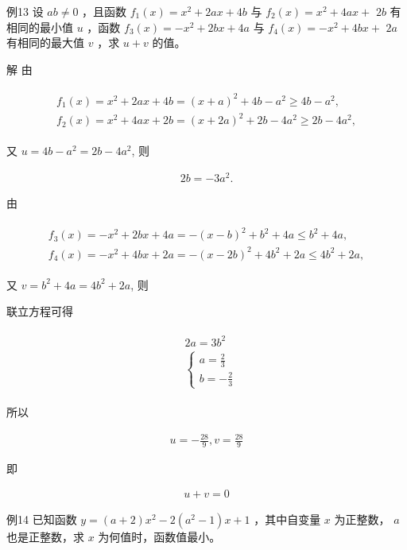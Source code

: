 \documentclass[10pt]{article}
\begin{document}
例13 设 $a b \neq 0$ ，且函数 $f_{1}(x)=x^{2}+2 a x+4 b$ 与 $f_{2}(x)=x^{2}+4 a x+$ $2 b$ 有相同的最小值 $u$ ，函数 $f_{3}(x)=-x^{2}+2 b x+4 a$ 与 $f_{4}(x)=-x^{2}+4 b x+$ $2 a$ 有相同的最大值 $v$ ，求 $u+v$ 的值。

解 由

\begin{align*}
\begin{gathered}
f_{1}(x)=x^{2}+2 a x+4 b=(x+a)^{2}+4 b-a^{2} \geqslant 4 b-a^{2}, \\
f_{2}(x)=x^{2}+4 a x+2 b=(x+2 a)^{2}+2 b-4 a^{2} \geqslant 2 b-4 a^{2},
\end{gathered}
\end{align*}

又 $u=4 b-a^{2}=2 b-4 a^{2}$, 则

\begin{align*}
2 b=-3 a^{2} .
\end{align*}

由

\begin{align*}
\begin{gathered}
f_{3}(x)=-x^{2}+2 b x+4 a=-(x-b)^{2}+b^{2}+4 a \leqslant b^{2}+4 a, \\
f_{4}(x)=-x^{2}+4 b x+2 a=-(x-2 b)^{2}+4 b^{2}+2 a \leqslant 4 b^{2}+2 a,
\end{gathered}
\end{align*}

又 $v=b^{2}+4 a=4 b^{2}+2 a$, 则

联立方程可得

\begin{align*}
\begin{aligned}
& 2 a=3 b^{2} \\
& \left\{\begin{array}{l}
a=\frac{2}{3} \\
b=-\frac{2}{3}
\end{array}\right.
\end{aligned}
\end{align*}

所以

\begin{align*}
u=-\frac{28}{9}, v=\frac{28}{9}
\end{align*}

即

\begin{align*}
u+v=0
\end{align*}

例14 已知函数 $y=(a+2) x^{2}-2\left(a^{2}-1\right) x+1$ ，其中自变量 $x$ 为正整数， $a$ 也是正整数，求 $x$ 为何值时，函数值最小。
\end{document}
